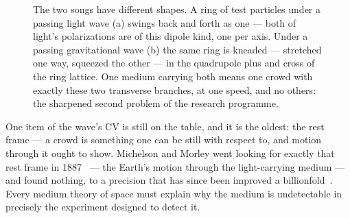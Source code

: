 \documentclass[fontsize=11pt,paper=a4,pagesize=auto,parskip=half-]{scrbook}
\begin{document}
\begin{figure}[htbp]
\centering
{}
\caption{The two songs have different shapes. A ring of test particles under a passing light wave (a) swings back and forth as one --- both of light's polarizations are of this dipole kind, one per axis. Under a passing gravitational wave (b) the same ring is kneaded --- stretched one way, squeezed the other --- in the quadrupole plus and cross of the ring lattice. One medium carrying both means one crowd with exactly these two transverse branches, at one speed, and no others: the sharpened second problem of the research programme.}
\label{fig:dipolequadrupole}
\end{figure}


One item of the wave's CV is still on the table, and it is the oldest: the rest frame --- a crowd is something one can be still with respect to, and motion through it ought to show. Michelson and Morley went looking for exactly that rest frame in 1887~\cite{michelsonmorley1887} --- the Earth's motion through the light-carrying medium --- and found nothing, to a precision that has since been improved a billionfold~\cite{herrmann2009}. Every medium theory of space must explain why the medium is undetectable in precisely the experiment designed to detect it.
\end{document}
